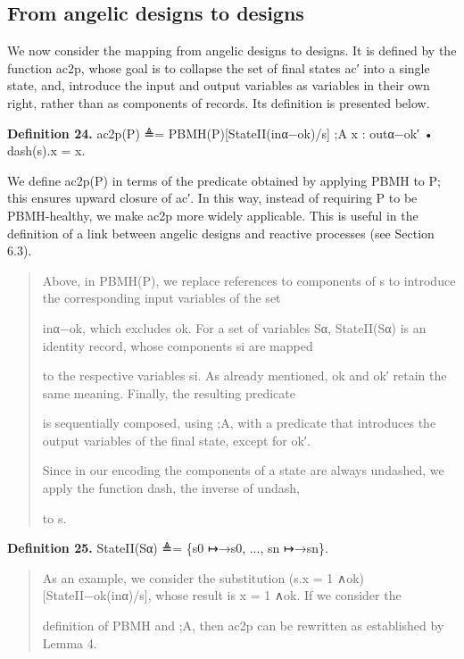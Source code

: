 \documentclass[11pt]{article}
\begin{document}
\subsection{From angelic designs to designs}
We now consider the mapping from angelic designs to designs. It is defined by the function ac2p, whose goal is to collapse the set of final states ac′ into a single state, and, introduce the input and output variables as variables in their own right, rather than as components of records. Its definition is presented below.

\noindent\textbf{Definition 24.} ac2p(P) ≜= PBMH(P)[StateII(inα−ok)/s] ;A x : outα−ok′ • dash(s).x = x.


We define ac2p(P) in terms of the predicate obtained by applying PBMH to P; this ensures upward closure of ac′. In this way, instead of requiring P to be PBMH-healthy, we make ac2p more widely applicable. This is useful in the definition of a link between angelic designs and reactive processes (see Section 6.3).

\begin{quote}\small\raggedright
Above, in PBMH(P), we replace references to components of s to introduce the corresponding input variables of the set
\par
inα−ok, which excludes ok. For a set of variables Sα, StateII(Sα) is an identity record, whose components si are mapped
\par
to the respective variables si. As already mentioned, ok and ok′ retain the same meaning. Finally, the resulting predicate
\par
is sequentially composed, using ;A, with a predicate that introduces the output variables of the final state, except for ok′.
\par
Since in our encoding the components of a state are always undashed, we apply the function dash, the inverse of undash,
\par
to s.
\end{quote}

\noindent\textbf{Definition 25.} StateII(Sα) ≜= \{s0 ↦→s0, ..., sn ↦→sn\}.


\begin{quote}\small\raggedright
As an example, we consider the substitution (s.x = 1 ∧ok)[StateII−ok(inα)/s], whose result is x = 1 ∧ok. If we consider the
\par
definition of PBMH and ;A, then ac2p can be rewritten as established by Lemma 4.
\end{quote}
\end{document}

